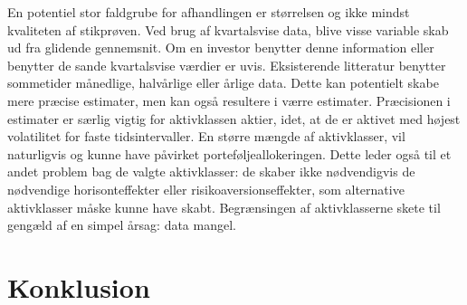 \documentclass[
  a4paper,
  oneside]{memoir}
\begin{document}
En potentiel stor faldgrube for afhandlingen er størrelsen og ikke mindst kvaliteten af stikprøven. Ved brug af kvartalsvise data, blive visse variable skab ud fra glidende gennemsnit. Om en investor benytter denne information eller benytter de sande kvartalsvise værdier er uvis. Eksisterende litteratur benytter sommetider månedlige, halvårlige eller årlige data. Dette kan potentielt skabe mere præcise estimater, men kan også resultere i værre estimater. Præcisionen i estimater er særlig vigtig for aktivklassen aktier, idet, at de er aktivet med højest volatilitet for faste tidsintervaller. En større mængde af aktivklasser, vil naturligvis og kunne have påvirket porteføljeallokeringen. Dette leder også til et andet problem bag de valgte aktivklasser: de skaber ikke nødvendigvis de nødvendige horisonteffekter eller risikoaversionseffekter, som alternative aktivklasser måske kunne have skabt. Begrænsingen af aktivklasserne skete til gengæld af en simpel årsag: data mangel.

\hypertarget{konklusion}{%
\chapter{Konklusion}\label{konklusion}}
\end{document}
